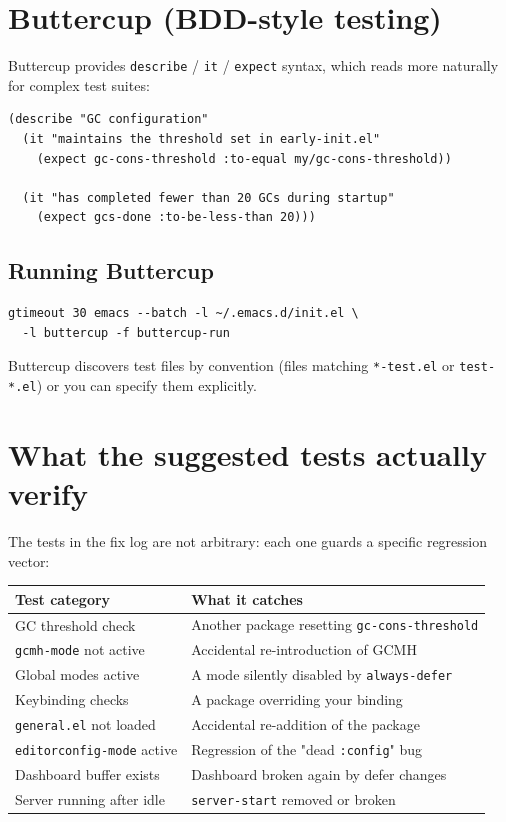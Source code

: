 \section{Buttercup (BDD-style testing)}\label{buttercup-bdd-style-testing}

Buttercup provides \texttt{describe} / \texttt{it} / \texttt{expect} syntax, which reads more naturally for complex test suites:

\begin{verbatim}
(describe "GC configuration"
  (it "maintains the threshold set in early-init.el"
    (expect gc-cons-threshold :to-equal my/gc-cons-threshold))

  (it "has completed fewer than 20 GCs during startup"
    (expect gcs-done :to-be-less-than 20)))
\end{verbatim}

\subsection{Running Buttercup}\label{running-buttercup}

\begin{verbatim}
gtimeout 30 emacs --batch -l ~/.emacs.d/init.el \
  -l buttercup -f buttercup-run
\end{verbatim}

Buttercup discovers test files by convention (files matching \texttt{*-test.el} or \texttt{test-*.el}) or you can specify them explicitly.

\section{What the suggested tests actually verify}\label{what-the-suggested-tests-actually-verify}

The tests in the fix log are not arbitrary: each one guards a specific regression vector:

\begin{longtable}[]{@{}ll@{}}
\toprule
Test category & What it catches \\
\midrule
GC threshold check & Another package resetting \texttt{gc-cons-threshold} \\
\texttt{gcmh-mode} not active & Accidental re-introduction of GCMH \\
Global modes active & A mode silently disabled by \texttt{always-defer} \\
Keybinding checks & A package overriding your binding \\
\texttt{general.el} not loaded & Accidental re-addition of the package \\
\texttt{editorconfig-mode} active & Regression of the "dead \texttt{:config}" bug \\
Dashboard buffer exists & Dashboard broken again by defer changes \\
Server running after idle & \texttt{server-start} removed or broken \\
\bottomrule
\end{longtable}


